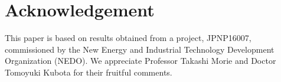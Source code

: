 \documentclass{article}
\begin{document}
\begin{comment}
RNN は入出力系列の対応関係を任意の精度で近似できるが\cite{schafer2006recurrent}、
再帰結合の最適化は勾配消失や勾配爆発により難しい\cite{bengio1994learning}。
そのためそれらの問題を解消した LSTM\cite{hochreiter1997long} や GRU\cite{cho2014learning} など多くの変種が提案されてきたが、長いデータに対する勾配学習の遅さは解消できていない。
RC は読み取り層の線形変換のみ学習することで、ある程度の性能を確保しつつ、学習を高速に終えられる系である\cite{jaeger2004harnessing, tanaka2019recent}。
RC の性能評価には平均二乗誤差のほかに、規格化された二乗誤差に由来する IPC も用いられている\cite{dambre2012information, kubota2021unifying}。
入出力対応関係の近似精度を知るには有限長データに対する IPC ではなく、無限長データに対する IPC を評価しなければならないが、単純に長いデータで評価するだけでは、極限値との差分が曖昧なままになる。
本研究は IPC の漸近展開を用いて極限値との差を明確にし、さらにフィッティングを用いて極限値を推定する方法を提案した。
今回は ESN に適用したが、この推定法は ESN 以外の RC にも適応できるので、ぜひ使っていただきたい。
この推定は単にデータ長を伸ばすより正確に IPC を推定できるとはいえ、長いデータで何度も試行する必要があるので、計算が重いのが欠点である。
これは推定精度とのトレードオフなので、取得できるデータの長さと合わせて設計者側が適切に選んでいただきたい。
どのようなトレードオフになっているかは今後の課題である。
\end{comment}


\section*{Acknowledgement}
This paper is based on results obtained from a project, JPNP16007, commissioned by the New Energy and Industrial
Technology Development Organization (NEDO). 
We appreciate Professor Takashi Morie and Doctor Tomoyuki Kubota for their fruitful comments. 

\appendix
\begin{comment}
 本文でごまかした導出を書く必要があるかもしれない。
 特に定常仮定の中心極限定理部分。
 もし書く必要があるなら、単独では無理なので、誰かに協力を頼む。
\end{comment}
\end{document}
